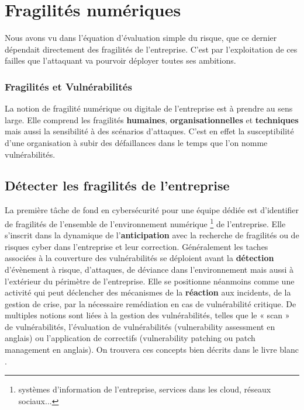 
\section{Fragilités numériques}

Nous avons vu dans l'équation d'évaluation simple du risque, que ce dernier dépendait directement des fragilités de l'entreprise. C'est par l'exploitation de ces failles que l'attaquant va pourvoir déployer toutes ses ambitions.

\begin{frame}
\frametitle<presentation>{Fragilités et Vulnérabilités}
La notion de fragilité numérique ou digitale de l'entreprise est à prendre au sens large. Elle comprend les fragilités \textbf{humaines}, \textbf{organisationnelles} et \textbf{techniques} mais aussi la sensibilité à des scénarios d'attaques. C'est en effet la susceptibilité d’une organisation à subir des défaillances dans le temps que l'on nomme vulnérabilités.
\end{frame}

\subsection{Détecter les fragilités de l’entreprise}

La première tâche de fond en cybersécurité pour une équipe dédiée est d'identifier de fragilités de l'ensemble de l'environnement numérique \footnote{systèmes d'information de l'entreprise, services dans les cloud, réseaux sociaux...} de l'entreprise. Elle s'inscrit dans la dynamique de l'\textbf{anticipation} avec la recherche de fragilités ou de risques cyber dans l'entreprise et leur correction. Généralement les taches associées à la couverture des vulnérabilités se déploient avant la \textbf{détection} d'évènement à risque, d'attaques, de déviance dans l'environnement mais aussi à l'extérieur du périmètre de l'entreprise.
Elle se positionne néanmoins comme une activité qui peut déclencher des mécanismes de la \textbf{réaction} aux incidents, de la gestion de crise, par la nécessaire remédiation en cas de vulnérabilité critique.
De multiples notions sont liées à la gestion des vulnérabilités, telles que le « scan » de vulnérabilités, l’évaluation de vulnérabilités (vulnerability assessment en anglais) ou l’application de correctifs (vulnerability patching ou patch management en anglais). On trouvera ces concepts bien décrits dans le livre blanc .


